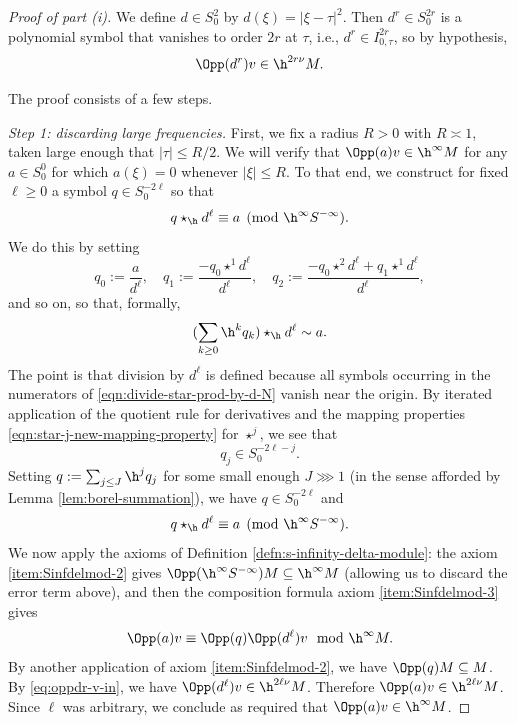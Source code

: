 \begin{proof}[Proof of part (i)]
  We define $d \in S^2_0$ by $d(\xi) = |\xi - \tau|^2$.  Then $d^r \in S^{2 r}_0$ is a polynomial symbol that vanishes to order $2 r$ at $\tau$, i.e., $d^r \in I_{0,\tau}^{2 r}$, so by hypothesis,
  \begin{equation}\label{eq:oppdr-v-in}
    \Opp(d^r) v \in \h^{2 r \nu } M.
  \end{equation}

  The proof consists of a few steps.

  \emph{Step 1: discarding large frequencies.}  First, we fix a radius $R > 0$ with $R \asymp 1$, taken large enough that $|\tau| \leq R/2$.  We will verify that $\Opp(a) v \in \h^\infty M$ for any $a \in S^0_0$ for which $a(\xi) = 0$ whenever $|\xi| \leq R$.  To that end, we construct for fixed $\ell \geq 0$ a symbol $q \in S^{-2 \ell}_0$ so that
  \[
    q \star_{\h} d^{\ell} \equiv a\pmod{ \h^\infty S^{-\infty} }.
  \]
  We do this by setting
  \begin{equation}\label{eqn:divide-star-prod-by-d-N}
    q_0 :=
    \frac{
      a
    }{
      d^\ell
    },
    \quad
    q_1 := \frac{- q_0 \star^1 d^\ell }{d^\ell},
    \quad
    q_2 :=
    \frac{- q_0 \star^2 d^\ell
      + q_1 \star^1 d^\ell
    }{
      d^\ell
    },
  \end{equation}
  and so on, so that, formally,
  \[
    (\sum_{k \geq 0} \h^k q_k) \star_{\h} d^\ell \sim a.
  \]
  The point is that division by $d^\ell$ is defined because all symbols occurring in the numerators of \eqref{eqn:divide-star-prod-by-d-N} vanish near the origin.  By iterated application of the quotient rule for derivatives and the mapping properties \eqref{eqn:star-j-new-mapping-property} for $\star^j$, we see that
  \begin{equation*}
    q_j \in S^{-2 \ell-j}_0.
  \end{equation*}
  Setting $q := \sum_{j \leq J} \h^j q_j$ for some small enough $J \ggg 1$ (in the sense afforded by Lemma \ref{lem:borel-summation}), we have $q \in S^{-2 \ell}_0$ and
  \begin{equation}\label{eqn:q-star-d-N-equiv-1-minus-a}
    q \star_{\h} d^\ell \equiv a \pmod{\h^\infty S^{-\infty}}.
  \end{equation}
  We now apply the axioms of Definition \ref{defn:s-infinity-delta-module}: the axiom \eqref{item:Sinfdelmod-2} gives \(\Opp(\h^\infty S^{-\infty}) M \subseteq \h^\infty M\) (allowing us to discard the error term above), and then the composition formula axiom \eqref{item:Sinfdelmod-3} gives
  \begin{equation}\label{eqn:composition-formula-appl-to-v-minus-opp-a-v}
    \Opp(a) v
    \equiv
    \Opp(q) \Opp(d^\ell) v \mod{\h^\infty M}.
  \end{equation}
  By another application of axiom \eqref{item:Sinfdelmod-2}, we have $\Opp(q) M \subseteq M$.  By \eqref{eq:oppdr-v-in}, we have $\Opp(d^\ell) v \in \h^{2 \ell \nu} M$.  Therefore $\Opp(a) v \in \h^{2 \ell \nu} M$.  Since $\ell$ was arbitrary, we conclude as required that $\Opp(a) v \in \h^\infty M$.


\end{proof}
